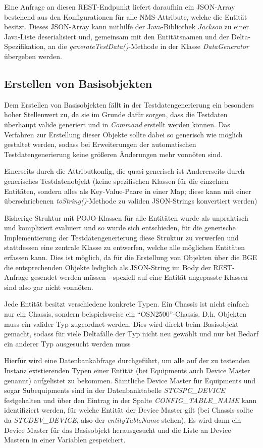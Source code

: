 Eine Anfrage an diesen \ac{REST}-Endpunkt liefert daraufhin ein \ac{JSON}-Array bestehend aus den Konfigurationen für alle \ac{NMS}-Attribute, welche die Entität besitzt. Dieses \ac{JSON}-Array kann mithilfe der Java-Bibliothek \textit{Jackson} zu einer Java-Liste deserialisiert und, gemeinsam mit den Entitätsnamen und der Delta-Spezifikation, an die \textit{generateTestData()}-Methode in der Klasse \textit{DataGenerator} übergeben werden.

\subsection{Erstellen von Basisobjekten}\label{subsec:baseObjects}
Dem Erstellen von Basisobjekten fällt in der Testdatengenerierung ein besonders hoher Stellenwert zu, da sie im Grunde dafür sorgen, dass die Testdaten überhaupt valide generiert und in \textit{Command} erstellt werden können. Das Verfahren zur Erstellung dieser Objekte sollte dabei so generisch wie möglich gestaltet werden, sodass bei Erweiterungen der automatischen Testdatengenerierung keine größeren Änderungen mehr vonnöten sind. 

Einerseits durch die Attributkonfig, die quasi generisch ist
Andererseits durch generisches Testdatenobjekt (keine spezifischen Klassen für die einzelnen Entitäten, sondern alles als Key-Value-Paare in einer Map; diese kann mit einer überschriebenen \textit{toString()}-Methode zu validen \ac{JSON}-Strings konvertiert werden)

Bisherige Struktur mit \ac{POJO}-Klassen für alle Entitäten wurde als unpraktisch und kompliziert evaluiert und so wurde sich entschieden, für die generische Implementierung der Testdatengenerierung diese Struktur zu verwerfen und stattdessen eine zentrale Klasse zu entwerfen, welche alle möglichen Entitäten erfassen kann. Dies ist möglich, da für die Erstellung von Objekten über die \ac{BGE} die entsprechenden Objekte lediglich als \ac{JSON}-String im Body der \ac{REST}-Anfrage gesendet werden müssen - speziell auf eine Entität angepasste Klassen sind also gar nicht vonnöten. 

Jede Entität besitzt verschiedene konkrete Typen. Ein Chassis ist nicht einfach nur ein Chassis, sondern beispielsweise ein \enquote{OSN2500}-Chassis.
D.h. Objekten muss ein valider Typ zugeordnet werden. Dies wird direkt beim Basisobjekt gemacht, sodass für viele Deltafälle der Typ nicht neu gewählt und nur bei Bedarf ein anderer Typ ausgesucht werden muss

Hierfür wird eine Datenbankabfrage durchgeführt, um alle auf der zu testenden Instanz existierenden Typen einer Entität (bei Equipments auch Device Master genannt) aufgelistet zu bekommen. Sämtliche Device Master für Equipments und sogar Subequipments sind in der Datenbanktabelle \textit{STCSPC\_DEVICE} festgehalten und über den Eintrag in der Spalte \textit{CONFIG\_TABLE\_NAME} kann identifiziert werden, für welche Entität der Device Master gilt (bei Chassis sollte da \textit{STCDEV\_DEVICE}, also der \textit{entityTableName} stehen). Es wird dann ein Device Master für das Basisobjekt herausgesucht und die Liste an Device Mastern in einer Variablen gespeichert.

